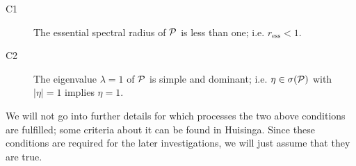\begin{description}
    \item[C1] The essential spectral radius of $\mathcal{P}$ is less than one; i.e. $r_{\mathrm{ess}} < 1$.
    \item[C2] The eigenvalue $\lambda=1$ of $\mathcal{P}$ is simple and dominant; i.e. $\eta \in \sigma(\mathcal{P})$ with $|\eta| = 1$ implies $\eta = 1$.
\end{description}
We will not go into further details for which processes the two above conditions are fulfilled; 
some criteria about it can be found in Huisinga\cite{huisinga2001metastability}.
Since these conditions are required for the later investigations, we will just assume that they are true.


